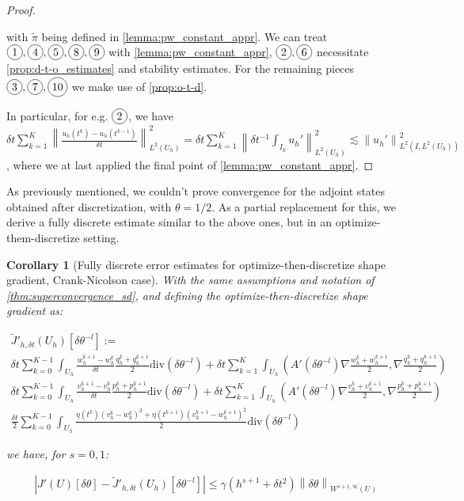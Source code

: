 \documentclass[english,a4paper,10pt,oneside]{scrbook}	%
\theoremstyle{break}
\newtheorem{cor}[equation]{Corollary}
\newenvironment{mproof}[1][\proofname]{%
  \begin{proof}[#1]$ $\par\nobreak\ignorespaces
}{%
  \end{proof}
}
\renewcommand*{\proofname}{Proof}
\theoremstyle{remark}
\newcommand{\ds}{\displaystyle}
\newcommand{\norm}[1]{\left\lVert#1\right\rVert}
\newcommand{\te}{\theta}
\newcommand{\dive}{\text{div}}
\newcommand*\circled[1]{\tikz[baseline=(char.base)]{
            \node[shape=circle,draw,inner sep=2pt] (char) {#1};}}
\begin{document}
\begin{mproof}
with $\tilde{\pi}$ being defined in \cref{lemma:pw_constant_appr}. We can treat $\circled{1},\circled{4},\circled{5},\circled{8},\circled{9}$ with \cref{lemma:pw_constant_appr}, $\circled{2},\circled{6}$ necessitate \cref{prop:d-t-o_estimates} and stability estimates. For the remaining pieces  $\circled{3},\circled{7},\circled{10}$ we make use of \cref{prop:o-t-d}.

In particular, for e.g. $\circled{2}$, we have $\ds\delta t \sum_{k=1}^K\norm{\frac{u_h(t^k)-u_h(t^{k-1})}{\delta t}}_{L^2(U_h)}^2 = \delta t\sum_{k=1}^K\norm{\delta t^{-1}\int_{I_k}u_h'}_{L^2(U_h)}^2\lesssim \norm{u_h'}_{L^2(I,L^2(U_h))}^2 $, where we at last applied the final point of \cref{lemma:pw_constant_appr}.
\end{mproof}

As previously mentioned, we couldn't prove convergence for the adjoint states obtained after discretization, with $\te = 1/2$. As a partial replacement for this, we derive a fully discrete estimate similar to the above ones, but in an optimize-them-discretize setting.

\begin{cor}[Fully discrete error estimates for optimize-then-discretize shape gradient, Crank-Nicolson case]
\label{cor:superconvergence_sd_fd_CN}
With the same assumptions and notation of \cref{thm:superconvergence_sd}, and defining the optimize-then-discretize shape gradient as:

\begin{align*}
\tilde{J}'_{h,\delta t} (U_h)[\delta \te^{-l}]:=\\
\delta t \sum_{k=0}^{K-1} \int_{U_h} \frac{w_h^{k+1}-w_h^{k}}{\delta t}\frac{q_h^k+q_h^{k+1}}{2} \dive(\delta \te^{-l})+\delta t \sum_{k=1}^K \int_{U_h} \left(A'(\delta \te^{-l})\nabla \frac{w_h^k+ w_h^{k+1}}{2} ,\nabla \frac{q_h^{k}+q_h^{k+1}}{2}\right )\\
\delta t \sum_{k=0}^{K-1} \int_{U_h} \frac{v_h^{k+1}-v_h^{k}}{\delta t}\frac{p_h^k+p_h^{k+1}}{2} \dive(\delta \te^{-l})+\delta t \sum_{k=1}^K \int_{U_h} \left(A'(\delta \te^{-l})\nabla \frac{v_h^k+ v_h^{k+1}}{2} ,\nabla \frac{p_h^{k}+p_h^{k+1}}{2}\right )\\
\frac{\delta t}{2} \sum_{k=0}^{K-1} \int_{U_h}\frac{\eta(t^k)(v_h^k-w_h^k)^2 + \eta(t^{k+1})(v_h^{k+1}-w_h^{k+1})^2}{2}\dive(\delta \te^{-l})
\end{align*}

we have, for $s=0,1$:

\begin{align*}
	\left |J'(U)[\delta \te] - \tilde{J}'_{h,\delta t}(U_h)[\delta \te^{-l}] \right|\leq \gamma  (h^{s+1}+ \delta t^2)\norm{\delta \te}_{W^{{s+1},\infty}(U)}
\end{align*}


\end{cor}
\end{document}
